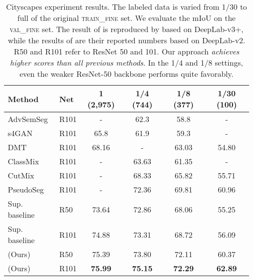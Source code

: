 \begin{table}[tb]
    \small
    \centering
    \caption{Cityscapes experiment results. The labeled data is varied from 1/30 to full of the original \textsc{train\_fine} set. We evaluate the mIoU on the \textsc{val\_fine} set. The result of \cite{french2020semi} is reproduced by \cite{zou2020pseudoseg} based on DeepLab-v3+, while the results of \cite{hung2019adversarial,mittal2019semi,fenga2020dmt,olsson2021classmix} are their reported numbers based on DeepLab-v2. R50 and R101 refer to ResNet 50 and 101. Our approach {\em achieves higher scores than all previous methods}. In the 1/4 and 1/8 settings, even the weaker ResNet-50 backbone performs quite favorably.}
    \label{tab:cityscapes}
    \setlength{\tabcolsep}{1.5pt}
    \begin{tabular}{@{}llcccc}
    \toprule
        Method    & Net & 1 (2,975) & 1/4 (744) & 1/8 (377) & 1/30 (100)  \\
    \midrule
        AdvSemSeg \cite{hung2019adversarial} & R101  & -  & 62.3\phantom{0}  & 58.8\phantom{0}  & -  \\
        s4GAN \cite{mittal2019semi}  & R101  & 65.8\phantom{0}  & 61.9\phantom{0}  & 59.3\phantom{0}  & -  \\
        DMT \cite{fenga2020dmt} & R101  & 68.16  & -  & 63.03  & 54.80  \\
        ClassMix \cite{olsson2021classmix} & R101 & - & 63.63  & 61.35  & -  \\
        CutMix \cite{french2020semi} & R101  & - &  68.33  & 65.82  & 55.71  \\
        PseudoSeg \cite{zou2020pseudoseg} & R101  & - & 72.36  & 69.81  & 60.96  \\
    \midrule
        Sup. baseline  & R50  & 73.64  & 72.86  & 68.06  & 55.25  \\
        Sup. baseline  & R101 & 74.88  & 73.31  & 68.72  & 56.09  \\
        \ours{} (Ours) & R50  & 75.39  & 73.80  & 72.11  & 60.37  \\
        \ours{} (Ours) & R101 & \textbf{75.99}  & \textbf{75.15}  & \textbf{72.29}  & \textbf{62.89}  \\
    \bottomrule
    \end{tabular}
    \vspace{-5pt}
\end{table}


